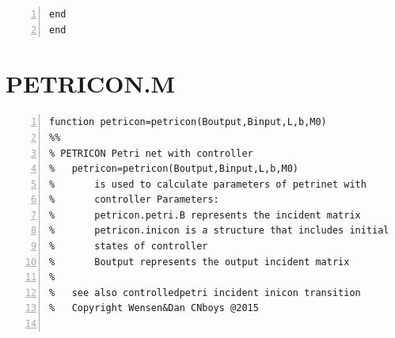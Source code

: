 \documentclass[11pt]{article}
\begin{document}
\begin{flushleft}
\begin{lstlisting}[numbers=left]
    end
end

\end{lstlisting}

\section{PETRICON.M}
\begin{lstlisting}[numbers=left]
function petricon=petricon(Boutput,Binput,L,b,M0)
%%
% PETRICON Petri net with controller
%   petricon=petricon(Boutput,Binput,L,b,M0)
%       is used to calculate parameters of petrinet with
%       controller Parameters:
%       petricon.petri.B represents the incident matrix
%       petricon.inicon is a structure that includes initial
%       states of controller
%       Boutput represents the output incident matrix
% 
%   see also controlledpetri incident inicon transition
%   Copyright Wensen&Dan CNboys @2015


\end{lstlisting}
\end{flushleft}
\end{document}
